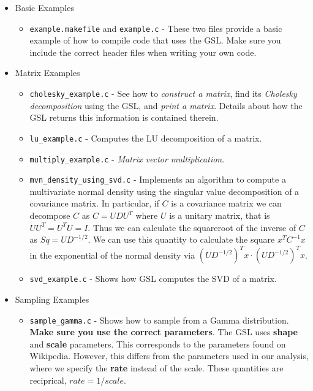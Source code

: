 \documentclass{report}
\begin{document}
\begin{itemize}

\item Basic Examples
\begin{itemize}

\item \texttt{example.makefile} and \texttt{example.c} - These two files provide a basic example of how to compile code that uses the GSL.  Make sure you include the correct header files when writing your own code.

\end{itemize}

\item Matrix Examples
\begin{itemize}

\item \texttt{cholesky\_example.c} - See how to \emph{construct a matrix}, find its \emph{Cholesky decomposition} using the GSL, and \emph{print a matrix}.  Details about how the GSL returns this information is contained therein.

\item \texttt{lu\_example.c} - Computes the LU decomposition of a matrix.

\item \texttt{multiply\_example.c} - \emph{Matrix vector multiplication}.

\item \texttt{mvn\_density\_using\_svd.c} - Implements an algorithm to compute a multivariate normal density using the singular value decomposition of a covariance matrix.  In particular, if $C$ is a covariance matrix we can decompose $C$ as $C = UDU^T$ where $U$ is a unitary matrix, that is $UU^T = U^TU = I$.  Thus we can calculate the squareroot of the inverse of $C$ as $Sq = UD^{-1/2}$.  We can use this quantity to calculate the square $x^TC^{-1}x$ in the exponential of the normal density via $(U D^{-1/2})^T x \cdot (U D^{-1/2})^T x$. 
\item \texttt{svd\_example.c} - Shows how GSL computes the SVD of a matrix.

\end{itemize}

\item Sampling Examples
\begin{itemize}

\item \texttt{sample\_gamma.c} - Shows how to sample from a Gamma distribution.  \textbf{Make sure you use the correct parameters}.  The GSL uses \textbf{shape} and \textbf{scale} parameters.  This corresponds to the parameters found on Wikipedia.  However, this differs from the parameters used in our analysis, where we specify the \textbf{rate} instead of the scale.  These quantities are reciprical, $rate = 1 / scale$.


\end{itemize}
\end{itemize}
\end{document}
